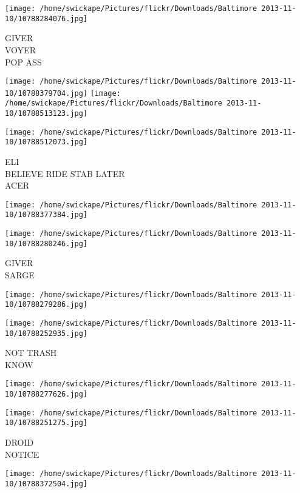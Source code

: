 \documentclass[10pt,letterpaper]{article}
\begin{document}
\vspace{0.25in}
\texttt{[image: /home/swickape/Pictures/flickr/Downloads/Baltimore 2013-11-10/10788284076.jpg]}

GIVER\\
VOYER\\
POP ASS
\pagebreak

\texttt{[image: /home/swickape/Pictures/flickr/Downloads/Baltimore 2013-11-10/10788379704.jpg]}
\texttt{[image: /home/swickape/Pictures/flickr/Downloads/Baltimore 2013-11-10/10788513123.jpg]}

\vspace{0.25in}
\texttt{[image: /home/swickape/Pictures/flickr/Downloads/Baltimore 2013-11-10/10788512073.jpg]}

ELI\\
BELIEVE RIDE STAB LATER\\
ACER
\pagebreak

\texttt{[image: /home/swickape/Pictures/flickr/Downloads/Baltimore 2013-11-10/10788377384.jpg]}

\vspace{0.25in}
\texttt{[image: /home/swickape/Pictures/flickr/Downloads/Baltimore 2013-11-10/10788280246.jpg]}

GIVER\\
SARGE
\pagebreak

\texttt{[image: /home/swickape/Pictures/flickr/Downloads/Baltimore 2013-11-10/10788279286.jpg]}

\vspace{0.25in}
\texttt{[image: /home/swickape/Pictures/flickr/Downloads/Baltimore 2013-11-10/10788252935.jpg]}

NOT TRASH\\
KNOW
\pagebreak

\texttt{[image: /home/swickape/Pictures/flickr/Downloads/Baltimore 2013-11-10/10788277626.jpg]}

\vspace{0.25in}
\texttt{[image: /home/swickape/Pictures/flickr/Downloads/Baltimore 2013-11-10/10788251275.jpg]}

DROID\\
NOTICE
\pagebreak

\texttt{[image: /home/swickape/Pictures/flickr/Downloads/Baltimore 2013-11-10/10788372504.jpg]}
\end{document}
